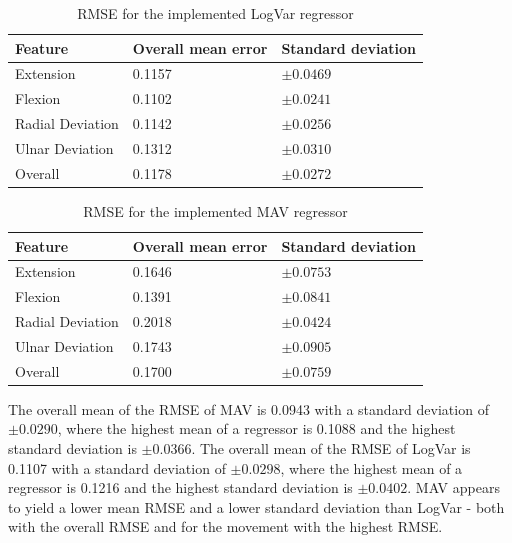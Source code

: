 	\begin{table}[!thpb]
		\begin{center}
			\begin{tabular}{l l l}
				\hline
				\textbf{Feature} & \textbf{Overall mean error} & \textbf{Standard deviation}\\
				\hline
				Extension & 0.1157 & $\pm 0.0469$ \\
				Flexion & 0.1102 & $\pm 0.0241$ \\
				Radial Deviation & 0.1142 & $\pm 0.0256$ \\
				Ulnar Deviation & 0.1312 & $\pm 0.0310$ \\
				Overall & 0.1178 & $\pm 0.0272$ \\
				\hline
			\end{tabular}
			\caption{RMSE for the implemented LogVar regressor}
		\end{center}
	\end{table}
	
	\begin{table}[!thpb]
		\begin{center}
			\begin{tabular}{l l l}
				\hline
				\textbf{Feature} & \textbf{Overall mean error} & \textbf{Standard deviation}\\
				\hline
				Extension & 0.1646 & $\pm 0.0753$ \\
				Flexion & 0.1391 & $\pm 0.0841$ \\
				Radial Deviation & 0.2018 & $\pm 0.0424$ \\
				Ulnar Deviation & 0.1743 & $\pm 0.0905$ \\
				Overall & 0.1700 & $\pm 0.0759$ \\
				\hline
			\end{tabular}
			\caption{RMSE for the implemented MAV regressor}
		\end{center}
	\end{table}
	
	The overall mean of the RMSE of MAV is 0.0943 with a standard deviation of $\pm 0.0290$, where the highest mean of a regressor is 0.1088 and the highest standard deviation is $\pm 0.0366$. The overall mean of the RMSE of LogVar is 0.1107 with a standard deviation of $\pm 0.0298$, where the highest mean of a regressor is 0.1216 and the highest standard deviation is $\pm 0.0402$. MAV appears to yield a lower mean RMSE and a lower standard deviation than LogVar - both with the overall RMSE and for the movement with the highest RMSE.
	
